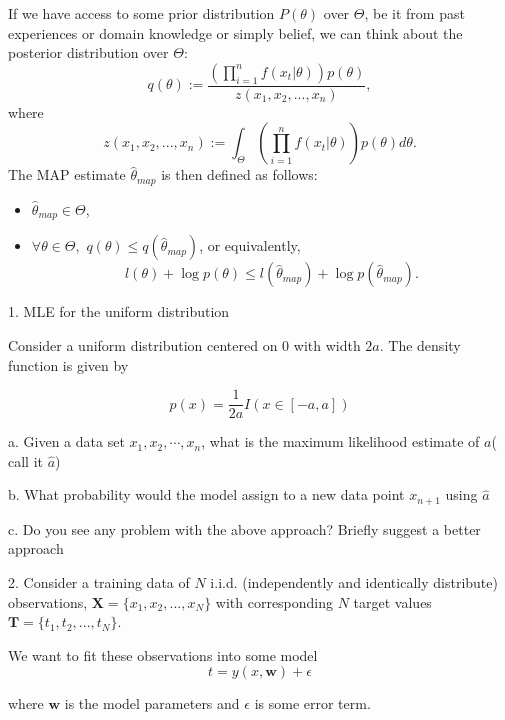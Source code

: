 \documentclass{article}
\theoremstyle{definition}
\theoremstyle{definition}
\theoremstyle{remark}
\begin{document}
If we have access to some prior distribution $P(\theta)$ over $\Theta$, be it from past experiences or domain knowledge
or simply belief, we can think about the posterior distribution over $\Theta$:
\begin{equation}
q(\theta):=\frac{\left(\prod_{i=1}^nf(x_t|\theta)\right)p(\theta)}{z(x_1,x_2,...,x_n)},
\end{equation}
where
\begin{equation}
z(x_1,x_2,...,x_n):=\int_\Theta \left(\prod_{i=1}^nf(x_t|\theta)\right)p(\theta) d\theta.
\end{equation}
The MAP estimate $\hat{\theta}_{map}$ is then defined as follows:
\begin{itemize}
  \item $\hat{\theta}_{map}\in \Theta$,
  \item $\forall \theta \in \Theta,$ $q(\theta)\leq q(\hat{\theta}_{map})$, or equivalently,
  \begin{equation}
  l(\theta)+\log p(\theta) \leq l(\hat{\theta}_{map}) + \log p(\hat{\theta}_{map}).
  \end{equation}
\end{itemize}

1. MLE for the uniform distribution

Consider a uniform distribution centered on 0 with width $2a$. The density function is given by

\begin{equation}
p(x) = \frac{1}{2a}I(x \in [-a, a])
\end{equation}


a. Given a data set $x_1, x_2, \cdots , x_n$, what is the maximum likelihood estimate of $a$( call it $\hat{a}$)

b. What probability would the model assign to a new data point $x_{n+1}$ using $\hat{a}$

c. Do you see any problem with the above approach? Briefly suggest a better approach



2. Consider a training data of $N$ i.i.d. (independently and identically distribute) observations, $\bm X=\{x_1, x_2, ..., x_N\}$ with corresponding $N$ target values $\bm T=\{t_1, t_2, ..., t_N\}$.

We want to fit these observations into some model
\begin{equation}\label{eq1}
t = y(x, \bm w) + \epsilon
\end{equation}

where $\bm w$ is the model parameters and $\epsilon$ is some error term.
\end{document}
